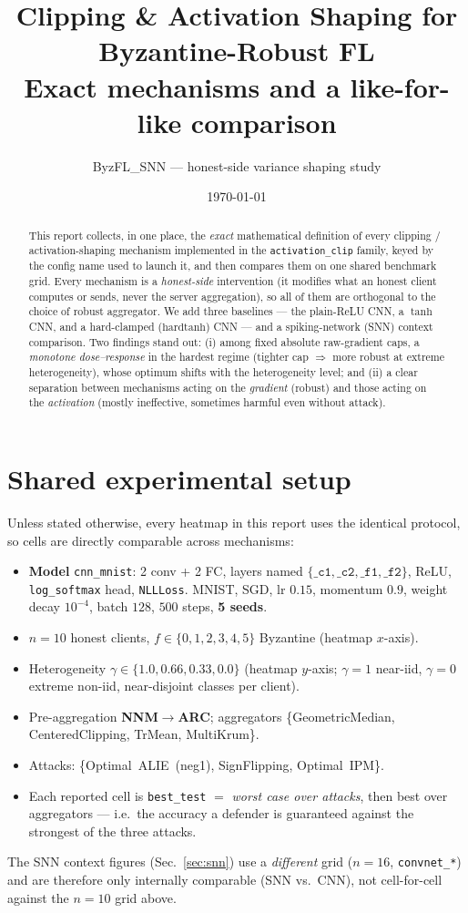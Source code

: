 \documentclass[11pt]{article}
\title{\textbf{Clipping \& Activation Shaping for Byzantine-Robust FL}\\[2pt]
\large Exact mechanisms and a like-for-like comparison}
\author{ByzFL\_SNN --- honest-side variance shaping study}
\date{\today}
\newcommand{\code}[1]{\texttt{#1}}
\begin{document}
\maketitle

\begin{abstract}
This report collects, in one place, the \emph{exact} mathematical definition of every
clipping / activation-shaping mechanism implemented in the \code{activation\_clip} family,
keyed by the config name used to launch it, and then compares them on one shared benchmark
grid. Every mechanism is a \emph{honest-side} intervention (it modifies what an honest
client computes or sends, never the server aggregation), so all of them are orthogonal to
the choice of robust aggregator. We add three baselines --- the plain-ReLU CNN, a
$\tanh$ CNN, and a hard-clamped ($\mathrm{hardtanh}$) CNN --- and a spiking-network (SNN)
context comparison. Two findings stand out: (i) among fixed absolute raw-gradient caps, a
\emph{monotone dose--response} in the hardest regime (tighter cap $\Rightarrow$ more robust
at extreme heterogeneity), whose optimum shifts with the heterogeneity level; and (ii) a
clear separation between mechanisms acting on the \emph{gradient} (robust) and those acting
on the \emph{activation} (mostly ineffective, sometimes harmful even without attack).
\end{abstract}

\section{Shared experimental setup}
Unless stated otherwise, every heatmap in this report uses the identical protocol, so cells
are directly comparable across mechanisms:
\begin{itemize}\itemsep2pt
  \item \textbf{Model} \code{cnn\_mnist}: 2 conv + 2 FC, layers named
        $\{\code{\_c1},\code{\_c2},\code{\_f1},\code{\_f2}\}$, ReLU, \code{log\_softmax} head,
        \code{NLLLoss}. MNIST, SGD, lr $0.15$, momentum $0.9$, weight decay $10^{-4}$,
        batch $128$, $500$ steps, \textbf{5 seeds}.
  \item $n=10$ honest clients, $f\in\{0,1,2,3,4,5\}$ Byzantine (heatmap $x$-axis).
  \item Heterogeneity $\gamma\in\{1.0,0.66,0.33,0.0\}$ (heatmap $y$-axis; $\gamma{=}1$ near-iid,
        $\gamma{=}0$ extreme non-iid, near-disjoint classes per client).
  \item Pre-aggregation \textbf{NNM$\to$ARC}; aggregators
        \{GeometricMedian, CenteredClipping, TrMean, MultiKrum\}.
  \item Attacks: \{Optimal~ALIE~(neg1), SignFlipping, Optimal~IPM\}.
  \item Each reported cell is \code{best\_test} $=$ \emph{worst case over attacks},
        then best over aggregators --- i.e.\ the accuracy a defender is guaranteed against
        the strongest of the three attacks.
\end{itemize}
The SNN context figures (Sec.~\ref{sec:snn}) use a \emph{different} grid ($n=16$,
\code{convnet\_*}) and are therefore only internally comparable (SNN vs.\ CNN), not
cell-for-cell against the $n=10$ grid above.
\end{document}
